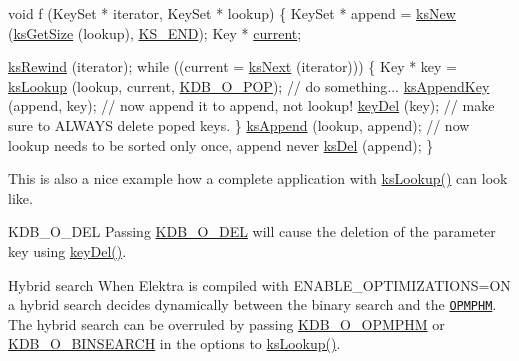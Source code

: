 \begin{DoxyCodeInclude}
\textcolor{keywordtype}{void} f (KeySet * iterator, KeySet * lookup)
\{
        KeySet * append = \hyperlink{group__keyset_ga671e1aaee3ae9dc13b4834a4ddbd2c3c}{ksNew} (\hyperlink{group__keyset_ga7474ad6b0a0fa969dbdf267ba5770eee}{ksGetSize} (lookup), \hyperlink{group__keyset_ga7a28fce3773b2c873c94ac80b8b4cd54}{KS\_END});
        Key * \hyperlink{classkdb_1_1KeySet_a0a0fc4efecd6dcbfde5fc35301b60349}{current};

        \hyperlink{group__keyset_gabe793ff51f1728e3429c84a8a9086b70}{ksRewind} (iterator);
        \textcolor{keywordflow}{while} ((current = \hyperlink{group__keyset_ga317321c9065b5a4b3e33fe1c399bcec9}{ksNext} (iterator)))
        \{
                Key * key = \hyperlink{group__keyset_ga60f1ddcf23272f2b29b90e92ebe9b56f}{ksLookup} (lookup, current, \hyperlink{group__keyset_ggada05f4bbf46fde81d0d57df86e73d914a52fb5f2cc86773d393da62bebebf7984}{KDB\_O\_POP});
                \textcolor{comment}{// do something...}
                \hyperlink{group__keyset_gaa5a1d467a4d71041edce68ea7748ce45}{ksAppendKey} (append, key); \textcolor{comment}{// now append it to append, not lookup!}
                \hyperlink{group__key_ga3df95bbc2494e3e6703ece5639be5bb1}{keyDel} (key);                \textcolor{comment}{// make sure to ALWAYS delete poped keys.}
        \}
        \hyperlink{group__keyset_ga21eb9c3a14a604ee3a8bdc779232e7b7}{ksAppend} (lookup, append);
        \textcolor{comment}{// now lookup needs to be sorted only once, append never}
        \hyperlink{group__keyset_ga27e5c16473b02a422238c8d970db7ac8}{ksDel} (append);
\}
\end{DoxyCodeInclude}
 This is also a nice example how a complete application with \hyperlink{group__keyset_ga60f1ddcf23272f2b29b90e92ebe9b56f}{ks\+Lookup()} can look like.

\begin{DoxyParagraph}{K\+D\+B\+\_\+\+O\+\_\+\+D\+EL}
Passing \hyperlink{group__keyset_ggada05f4bbf46fde81d0d57df86e73d914a66a5380c120f25f28f49848c4a863ead}{K\+D\+B\+\_\+\+O\+\_\+\+D\+EL} will cause the deletion of the parameter {\ttfamily key} using \hyperlink{group__key_ga3df95bbc2494e3e6703ece5639be5bb1}{key\+Del()}.
\end{DoxyParagraph}
\begin{DoxyParagraph}{Hybrid search}
When Elektra is compiled with {\ttfamily E\+N\+A\+B\+L\+E\+\_\+\+O\+P\+T\+I\+M\+I\+Z\+A\+T\+I\+O\+NS=ON} a hybrid search decides dynamically between the binary search and the \href{https://master.libelektra.org/doc/dev/data-structures.md#order-preserving-minimal-perfect-hash-map-aka-opmphm}{\tt O\+P\+M\+P\+HM}. The hybrid search can be overruled by passing \hyperlink{group__proposal_gga93673533c4c8eb1fdfca76b98c5f49b0afe9f6ff6e374540baf600a918b07ee6e}{K\+D\+B\+\_\+\+O\+\_\+\+O\+P\+M\+P\+HM} or \hyperlink{group__proposal_gga93673533c4c8eb1fdfca76b98c5f49b0ac67a43bd273203575090d26010f6c995}{K\+D\+B\+\_\+\+O\+\_\+\+B\+I\+N\+S\+E\+A\+R\+CH} in the options to \hyperlink{group__keyset_ga60f1ddcf23272f2b29b90e92ebe9b56f}{ks\+Lookup()}.
\end{DoxyParagraph}


